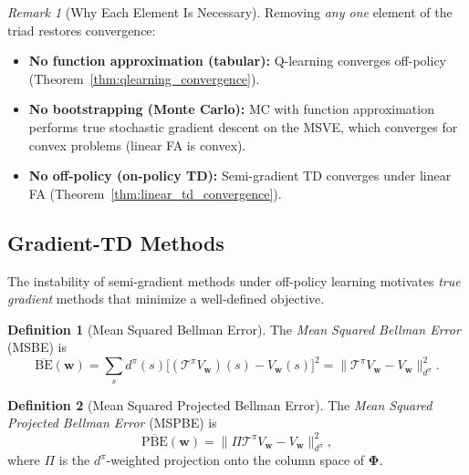 \documentclass[11pt,a4paper]{article}
\theoremstyle{definition}
\newtheorem{definition}{Definition}[section]
\theoremstyle{plain}
\theoremstyle{remark}
\newtheorem{remark}{Remark}[section]
\begin{document}
\begin{remark}[Why Each Element Is Necessary]
\label{rem:triad_elements}
Removing \emph{any one} element of the triad restores convergence:
\begin{itemize}[nosep]
    \item \textbf{No function approximation (tabular):} Q-learning converges off-policy (Theorem~\ref{thm:qlearning_convergence}).
    \item \textbf{No bootstrapping (Monte Carlo):} MC with function approximation performs true stochastic gradient descent on the MSVE, which converges for convex problems (linear FA is convex).
    \item \textbf{No off-policy (on-policy TD):} Semi-gradient TD converges under linear FA (Theorem~\ref{thm:linear_td_convergence}).
\end{itemize}
\end{remark}

\subsection{Gradient-TD Methods}
\label{subsec:gradient_td}

The instability of semi-gradient methods under off-policy learning motivates \emph{true gradient} methods that minimize a well-defined objective.

\begin{definition}[Mean Squared Bellman Error]
\label{def:msbe}
The \emph{Mean Squared Bellman Error} (MSBE) is
\begin{equation}
    \overline{\text{BE}}(\bm{w}) = \sum_s d^\pi(s)\bigl[(\mathcal{T}^\pi V_{\bm{w}})(s) - V_{\bm{w}}(s)\bigr]^2 = \|\mathcal{T}^\pi V_{\bm{w}} - V_{\bm{w}}\|_{d^\pi}^2.
    \label{eq:msbe}
\end{equation}
\end{definition}

\begin{definition}[Mean Squared Projected Bellman Error]
\label{def:mspbe}
The \emph{Mean Squared Projected Bellman Error} (MSPBE) is
\begin{equation}
    \overline{\text{PBE}}(\bm{w}) = \|\Pi\mathcal{T}^\pi V_{\bm{w}} - V_{\bm{w}}\|_{d^\pi}^2,
    \label{eq:mspbe}
\end{equation}
where $\Pi$ is the $d^\pi$-weighted projection onto the column space of $\bm{\Phi}$.
\end{definition}
\end{document}

